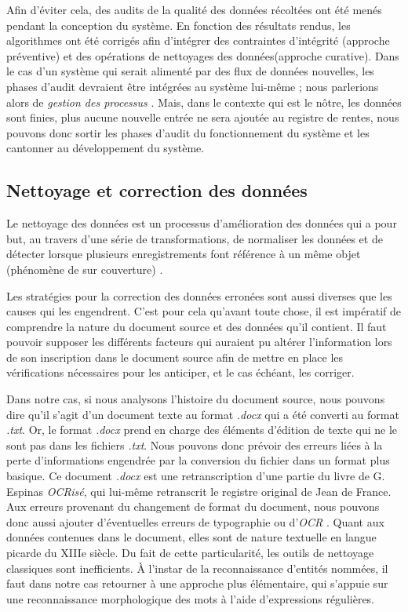 Afin d'éviter cela, des audits de la qualité des données récoltées ont été menés pendant la conception du système. En fonction des résultats rendus, les algorithmes ont été corrigés afin d'intégrer des contraintes d'intégrité (approche préventive) et des opérations de nettoyages des données(approche curative).
Dans le cas d'un système qui serait alimenté par des flux de données nouvelles, les phases d'audit devraient être intégrées au système lui-même ; nous parlerions alors de \textit{gestion des processus} \parencite{berti-equille_qualite_2004}. Mais, dans le contexte qui est le nôtre, les données sont finies, plus aucune nouvelle entrée ne sera ajoutée au registre de rentes, nous pouvons donc sortir les phases d'audit du fonctionnement du système et les cantonner au développement du système.

\subsection{Nettoyage et correction des données}
Le nettoyage des données est un processus d'amélioration des données qui a pour but, au travers d'une série de transformations, de normaliser les données et de détecter lorsque plusieurs enregistrements font référence à un même objet (phénomène de sur couverture) \parencite{berti-equille_qualite_2004}.

Les stratégies pour la correction des données erronées sont aussi diverses que les causes qui les engendrent. C'est pour cela qu'avant toute chose, il est impératif de comprendre la nature du document source et des données qu'il contient. Il faut pouvoir supposer les différents facteurs qui auraient pu altérer l'information lors de son inscription dans le document source afin de mettre en place les vérifications nécessaires pour les anticiper, et le cas échéant, les corriger.

Dans notre cas, si nous analysons \og l'histoire \fg{} du document source, nous pouvons dire qu'il s'agit d'un document texte au format \textit{.docx} qui  a été converti au format \textit{.txt}. Or, le format \textit{.docx} prend en charge des éléments d'édition de texte qui ne le sont pas dans les fichiers \textit{.txt}. Nous pouvons donc prévoir des erreurs liées à la perte d'informations engendrée par la conversion du fichier dans un format plus basique. 
Ce document \textit{.docx} est une retranscription d'une partie du livre de G. Espinas \textit{OCRisé}, qui lui-même retranscrit le registre original de Jean de France. Aux erreurs provenant du changement de format du document, nous pouvons donc aussi ajouter d'éventuelles erreurs de typographie ou d'\textit{OCR} \parencite{berti-equille_qualite_2004}.
Quant aux données contenues dans le document, elles sont de nature textuelle en langue picarde du XIIIe siècle. Du fait de cette particularité, les outils de nettoyage classiques sont inefficients. À l’instar de la reconnaissance d'entités nommées, il faut dans notre cas retourner à une approche plus élémentaire, qui s'appuie sur une reconnaissance morphologique des mots à l'aide d'expressions régulières. 

